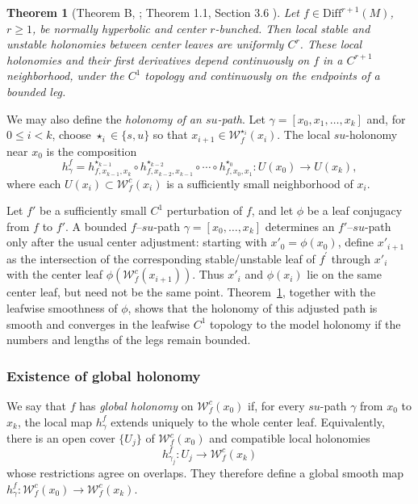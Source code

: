 \documentclass[11pt]{amsart}
\numberwithin{equation}{section}
\theoremstyle{plain}
\newtheorem{thm}{Theorem}[section]
\begin{document}
\begin{thm}[Theorem B, \cite{PSW}; Theorem 1.1, Section 3.6 \cite{Saghin}]\label{c1hol}
Let $f \in \mathrm{Diff}^{r+1}(M)$, $r \ge 1$, be normally hyperbolic
 and center $r$-bunched.  Then local stable and unstable  holonomies
between center leaves are uniformly $C^r$. These local holonomies and their first
derivatives depend continuously on $f$ in a $C^{r+1}$ neighborhood, under the $C^1$ topology and continuously on the
endpoints of a bounded leg.  
\end{thm}



We may also define the \emph{holonomy of an $su$-path}.   Let
$\gamma=[x_0,x_1,\ldots,x_k]$ and, for $0\le i<k$, choose
 $\star_i\in\{s,u\}$ so that
 $x_{i+1}\in\mathcal W_f^{\star_i}(x_i)$.   The local $su$-holonomy near
$x_0$ is the composition
 $$
h_\gamma^f = h^{\star_{k-1}}_{f,x_{k-1},x_k}
 \circ h^{\star_{k-2}}_{f,x_{k-2},x_{k-1}}
 \circ \cdots \circ h^{\star_0}_{f,x_0,x_1}:
 U(x_0) \longrightarrow U(x_k),
$$
where each $U(x_i)\subset\mathcal W_f^c(x_i)$ is a sufficiently small
neighborhood of $x_i$.

Let $f'$ be a sufficiently small $C^1$  perturbation of $f$, and let
$\phi$ be a leaf conjugacy from $f$ to $f'$.   A bounded $f$--$su$-path
$\gamma=[x_0,\ldots,x_k]$ determines an $f'$--$su$-path only after the
usual center adjustment: starting with $x'_0=\phi(x_0)$, define
$x'_{i+1}$ as the intersection of the corresponding stable/unstable leaf of $f^\prime$
through $x'_i$ with the center leaf $\phi(\mathcal W_f^c(x_{i+1}))$.
Thus $x'_i$ and $\phi(x_i)$ lie on the same center leaf, but need not be
the same point. Theorem~\ref{c1hol}, together with the leafwise
smoothness of $\phi$, shows that the holonomy of this adjusted path is
smooth and converges in the leafwise $C^1$ topology to the model
holonomy if the numbers and lengths of the legs remain bounded.



\subsubsection{Existence of global holonomy}
We say that $f$ has \emph{global holonomy} on
$\mathcal W_f^c(x_0)$ if, for every $su$-path $\gamma$ from $x_0$ to
$x_k$, the local map $h_\gamma^f$ extends uniquely to the whole center
leaf. Equivalently, there is an open cover $\{U_j\}$ of
$\mathcal W_f^c(x_0)$ and compatible local holonomies
 \[
h_{\gamma_j}^f:U_j\longrightarrow\mathcal W_f^c(x_k)
\]
whose restrictions agree on overlaps. They therefore define a global
smooth map
$h_\gamma^f:\mathcal W_f^c(x_0)\to\mathcal W_f^c(x_k)$.
\end{document}
